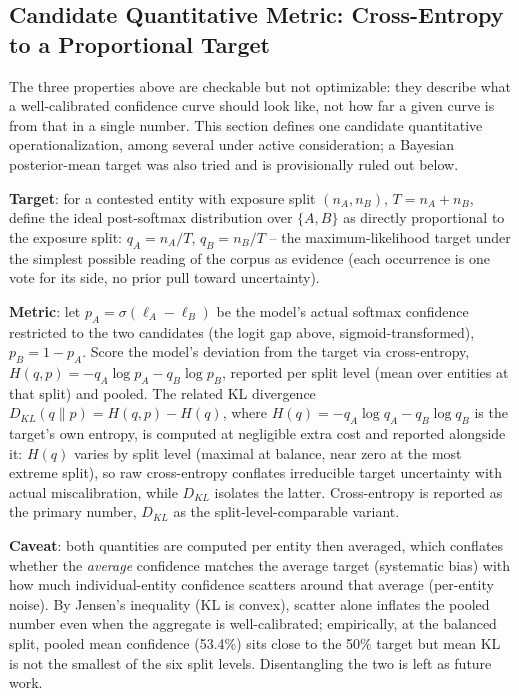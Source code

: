\documentclass[11pt]{article}
\begin{document}
\subsection{Candidate Quantitative Metric: Cross-Entropy to a Proportional Target}
\label{sec:xent-metric}

The three properties above are checkable but not optimizable: they describe
what a well-calibrated confidence curve should look like, not how far a
given curve is from that in a single number. This section defines one
candidate quantitative operationalization, among several under active
consideration; a Bayesian posterior-mean target was also tried and is
provisionally ruled out below.

\textbf{Target}: for a contested entity with exposure split $(n_A, n_B)$,
$T = n_A + n_B$, define the ideal post-softmax distribution over $\{A, B\}$
as directly proportional to the exposure split: $q_A = n_A / T$,
$q_B = n_B / T$ -- the maximum-likelihood target under the simplest possible
reading of the corpus as evidence (each occurrence is one vote for its side,
no prior pull toward uncertainty).

\textbf{Metric}: let $p_A = \sigma(\ell_A - \ell_B)$ be the model's actual
softmax confidence restricted to the two candidates (the logit gap above,
sigmoid-transformed), $p_B = 1 - p_A$. Score the model's deviation from the
target via cross-entropy, $H(q, p) = -q_A \log p_A - q_B \log p_B$, reported
per split level (mean over entities at that split) and pooled. The related KL
divergence $D_{KL}(q \| p) = H(q,p) - H(q)$, where
$H(q) = -q_A\log q_A - q_B\log q_B$ is the target's own entropy, is computed
at negligible extra cost and reported alongside it: $H(q)$ varies by split
level (maximal at balance, near zero at the most extreme split), so raw
cross-entropy conflates irreducible target uncertainty with actual
miscalibration, while $D_{KL}$ isolates the latter. Cross-entropy is reported
as the primary number, $D_{KL}$ as the split-level-comparable variant.

\textbf{Caveat}: both quantities are computed per entity then averaged, which
conflates whether the \emph{average} confidence matches the average target
(systematic bias) with how much individual-entity confidence scatters around
that average (per-entity noise). By Jensen's inequality (KL is convex),
scatter alone inflates the pooled number even when the aggregate is
well-calibrated; empirically, at the balanced split, pooled mean confidence
(53.4\%) sits close to the 50\% target but mean KL is not the smallest of the
six split levels. Disentangling the two is left as future work.
\end{document}
